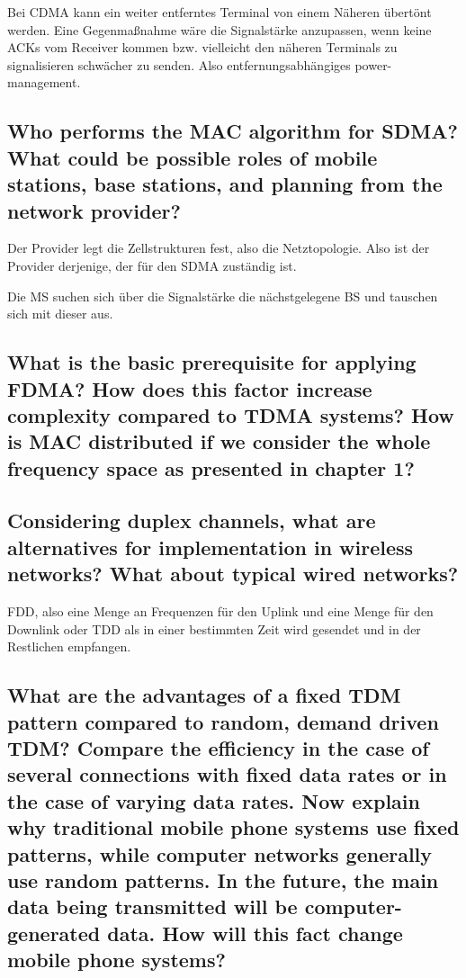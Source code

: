 Bei CDMA kann ein weiter entferntes Terminal von einem Näheren übertönt werden. Eine Gegenmaßnahme wäre die Signalstärke anzupassen, wenn keine ACKs vom Receiver kommen bzw. vielleicht den näheren Terminals zu signalisieren schwächer zu senden. Also entfernungsabhängiges power-management.


\subsection{Who performs the MAC algorithm for SDMA? What could be possible roles of mobile
stations, base stations, and planning from the network provider?}

Der Provider legt die Zellstrukturen fest, also die Netztopologie. Also ist der Provider derjenige, der für den SDMA zuständig ist.

Die MS suchen sich über die Signalstärke die nächstgelegene BS und tauschen sich mit dieser aus. 

\subsection{What is the basic prerequisite for applying FDMA? How does this factor increase
complexity compared to TDMA systems? How is MAC distributed if we consider the
whole frequency space as presented in chapter 1?}


\subsection{Considering duplex channels, what are alternatives for implementation in wireless
networks? What about typical wired networks?}
FDD, also eine Menge an Frequenzen für den Uplink und eine Menge für den Downlink oder TDD als in einer bestimmten Zeit wird gesendet und in der Restlichen empfangen.

\subsection{What are the advantages of a fixed TDM pattern compared to random, demand
driven TDM? Compare the efficiency in the case of several connections with fixed
data rates or in the case of varying data rates. Now explain why traditional mobile
phone systems use fixed patterns, while computer networks generally use random
patterns. In the future, the main data being transmitted will be computer-generated
data. How will this fact change mobile phone systems?}

